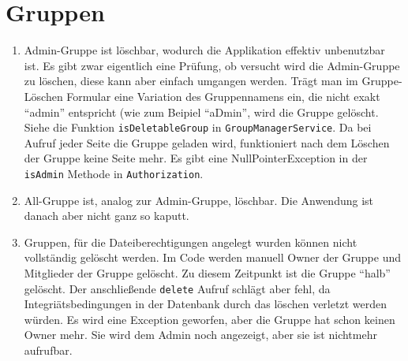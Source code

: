 \documentclass[12pt,DIV14,BCOR10mm,a4paper,parskip=half-,headsepline,headinclude,english,ngerman,bibliography=totocnumbered]{scrreprt}
\begin{document}
\section{Gruppen}
\begin{enumerate}[resume]
\item Admin-Gruppe ist löschbar, wodurch die Applikation effektiv unbenutzbar ist. Es gibt zwar eigentlich eine Prüfung, ob versucht wird die Admin-Gruppe zu löschen, diese kann aber einfach umgangen werden. Trägt man im Gruppe-Löschen Formular eine Variation des Gruppennamens ein, die nicht exakt \enquote{admin} entspricht (wie zum Beipiel \enquote{aDmin}, wird die Gruppe gelöscht. Siehe die Funktion \texttt{isDeletableGroup} in \texttt{GroupManagerService}. Da bei Aufruf jeder Seite die Gruppe geladen wird, funktioniert nach dem Löschen der Gruppe keine Seite mehr. Es gibt eine NullPointerException in der \texttt{isAdmin} Methode in \texttt{Authorization}.
\item All-Gruppe ist, analog zur Admin-Gruppe, löschbar. Die Anwendung ist danach aber nicht ganz so kaputt.
\item Gruppen, für die Dateiberechtigungen angelegt wurden können nicht vollständig gelöscht werden. Im Code werden manuell Owner der Gruppe und Mitglieder der Gruppe gelöscht. Zu diesem Zeitpunkt ist die Gruppe \enquote{halb} gelöscht. Der anschließende \texttt{delete} Aufruf schlägt aber fehl, da Integriätsbedingungen in der Datenbank durch das löschen verletzt werden würden. Es wird eine Exception geworfen, aber die Gruppe hat schon keinen Owner mehr. Sie wird dem Admin noch angezeigt, aber sie ist nichtmehr aufrufbar.
\end{enumerate}
\end{document}

